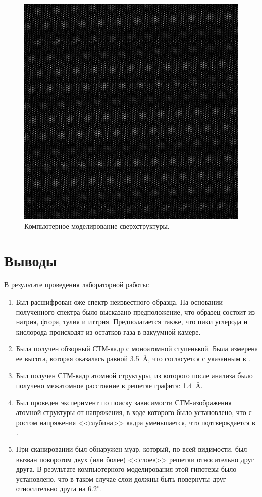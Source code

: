 \documentclass[a4paper, 12pt]{article}
\begin{document}
	\begin{figure}[H]
		\centering
		\includegraphics[width=0.9\linewidth]{../STM_data/Muar/Muar_model}
		\caption{Компьютерное моделирование сверхструктуры.}
		\label{fig:2_muar_model}
	\end{figure}
	
	\section{Выводы}
	
	В результате проведения лабораторной работы:
	
	\begin{enumerate}
		\item Был расшифрован оже-спектр неизвестного образца. На основании полученного спектра было высказано предположение, что образец состоит из натрия, фтора, тулия и иттрия. Предполагается также, что пики углерода и кислорода происходят из остатков газа в вакуумной камере.
		
		\item Была получен обзорный СТМ-кадр с моноатомной ступенькой. Была измерена ее высота, которая оказалась равной 3.5~\AA, что согласуется с указанным в \cite{Article}.
		
		\item Был получен СТМ-кадр атомной структуры, из которого после анализа было получено межатомное расстояние в решетке графита: 1.4~\AA.
		
		\item Был проведен эксперимент по поиску зависимости СТМ-изображения атомной структуры от напряжения, в ходе которого было установлено, что с ростом напряжения <<глубина>> кадра уменьшается, что подтверждается в \cite{STM_Binnig}.
		
		\item При сканировании был обнаружен муар, который, по всей видимости, был вызван поворотом двух (или более) <<слоев>> решетки относительно друг друга. В результате компьютерного моделирования этой гипотезы было установлено, что в таком случае слои должны быть повернуты друг относительно друга на $6.2^\circ$.
	\end{enumerate}
	
\end{document}
